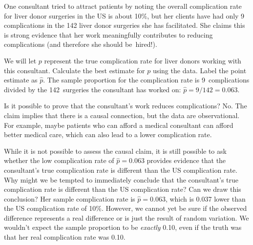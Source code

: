 One consultant tried to attract patients by noting the overall complication rate for liver donor surgeries in the US is about 10\%, but her clients have had only 9 complications in the 142 liver donor surgeries she has facilitated. She claims this is strong evidence that her work meaningfully contributes to reducing complications (and therefore she should be~hired!).

\begin{examplewrap}\begin{nexample}{We will let $p$ represent the true complication rate for liver donors working with this consultant. Calculate the best estimate for $p$ using the data.  Label the point estimate as $\hat{p}$.}
The sample proportion for the complication rate is 9~complications divided by the 142~surgeries the consultant has worked on: $\hat{p} = 9 / 142 = 0.063$.
\end{nexample}\end{examplewrap}

\begin{examplewrap}\begin{nexample}{Is it possible to prove that the consultant's work reduces complications?}
No. The claim implies that there is a causal connection, but the data are observational. For example, maybe patients who can afford a medical consultant can afford better medical care, which can also lead to a lower complication rate.
\end{nexample}\end{examplewrap}

\begin{examplewrap}\begin{nexample}{While it is not possible to assess the causal claim, it is still possible to ask whether the low complication rate of $\hat{p} = 0.063$ provides evidence that the consultant's true complication rate is different than the US complication rate. Why might we be tempted to immediately conclude that the consultant's true complication rate is different than the US complication rate? Can we draw this conclusion?}
Her sample complication rate is $\hat{p} = 0.063$, which is 0.037 lower than the US complication rate of 10\%. However, we cannot yet be sure if the observed difference represents a real difference or is just the result of random variation. We wouldn't expect the sample proportion to be \emph{exactly} 0.10, even if the truth was that her real complication rate was 0.10.
\end{nexample}\end{examplewrap}



